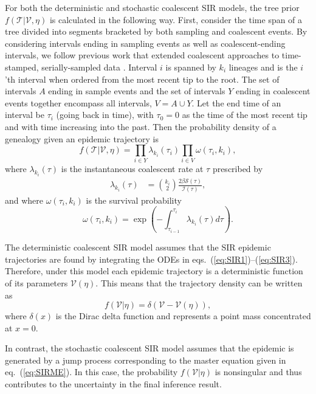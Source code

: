 \documentclass[12pt,titlepage]{article}
\newcommand{\St}{\mathcal{S}}
\newcommand{\It}{\mathcal{I}}
\newcommand{\traj}{\mathcal{V}}
\newcommand{\tree}{\mathcal{T}}
\begin{document}
For both the deterministic and stochastic coalescent SIR models, the tree prior $f(\tree|\traj,\eta)$ is calculated in the following way.  First, consider the time span of a tree divided into segments bracketed by both 
sampling and coalescent events. By considering intervals ending in sampling events as well as coalescent-ending intervals, we follow previous work
that extended coalescent approaches to time-stamped, serially-sampled data \citep{RodrigoFelsenstein1999,Drummond:2002}.
 Interval $i$ is spanned by $k_i$ lineages and is the 
$i$'th interval when ordered from the most recent tip to the root. The set of intervals 
$A$ ending in sample events and the set of intervals $Y$ ending in coalescent events 
together encompass all intervals, $V = A \cup Y$. Let the end time of an interval be $\tau_i$ 
(going back in time), with $\tau_0=0$ as the time of the most recent tip and with time increasing 
into the past. Then the probability density of a genealogy given an epidemic trajectory is
\begin{equation}
f(\tree|\traj, \eta) = \prod_{i \in Y} {\lambda}_{k_{i}}(\tau_i) \prod_{i\in V}\omega(\tau_i, 
k_i),
\label{eq:treeGivenTraj}
\end{equation}
where $\lambda_{k_i}(\tau)$ is the instantaneous coalescent rate at $\tau$ prescribed by
\cite{Volz:2012}
\begin{align}
\lambda_{k_i}(\tau) &= \binom{k_i}{2}\frac{2{\beta}{\St}({\tau})}{{\It}({\tau})},
\label{eq:coalrate}
\end{align}
and where $\omega(\tau_i,k_i)$ is the survival probability
\begin{equation}
\omega(\tau_i, k_i) = \exp\left({-{\int_{\tau_{i-1}}^{\tau_{i}}{\lambda_{k_i}(\tau)d\tau}}}\right).
\end{equation}

The deterministic coalescent SIR model assumes that the SIR epidemic
trajectories are found by integrating the ODEs in
eqs.~(\ref{eq:SIR1})--(\ref{eq:SIR3}).  Therefore, under this model each
epidemic trajectory is a deterministic function of its parameters
$\traj(\eta)$.  This means that the trajectory density can be written as
\begin{equation}
f(\traj|\eta)=\delta(\traj-\traj(\eta)),
\end{equation}
where $\delta(x)$ is the Dirac delta function and represents a point
mass concentrated at $x=0$.

In contrast, the stochastic coalescent SIR model assumes that the
epidemic is generated by a jump process corresponding to the master
equation given in eq.~(\ref{eq:SIRME}). In this case, the probability
$f(\traj|\eta)$ is nonsingular and thus contributes to the uncertainty
in the final inference result.
\end{document}
